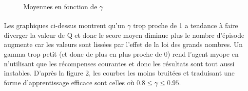 \documentclass[12pt,oneside,a4paper]{article}
\begin{document}
\begin{figure}[hbt!]
{        }
        \hspace{0mm}
        \caption{Moyennes en fonction de $\gamma$}
        \label{scoremoyen}
    \end{figure}

    \paragraph{}
    Les graphiques ci-dessus montrent qu'un $\gamma$ trop proche de 1 a tendance à faire diverger la
    valeur de $\mathrm{Q}$ et donc le score moyen diminue plus le nombre d'épisode augmente car les valeurs sont lissées
    par l'effet de la loi des grands nombres. Un gamma trop petit (et donc de plus en plus proche de 0)
    rend l'agent myope en n'utilisant que les récompenses courantes et donc les résultats sont tout aussi instables. D'après la figure 2,
    les courbes les moins bruitées et traduisant une forme d'apprentissage efficace sont celles où
    $0.8 \leq \gamma \leq 0.95$.
    \newpage
\end{document}
